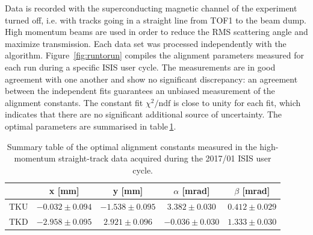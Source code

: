 Data is recorded with the superconducting magnetic channel of the experiment turned off, i.e. with tracks going in a straight line from TOF1 to the beam dump. High momentum beams are used in order to reduce the RMS scattering angle and maximize transmission.  
Each data set was processed independently with the algorithm. Figure~\ref{fig:runtorun} compiles the alignment parameters measured for each run during a specific ISIS user cycle. The measurements are in good agreement with one another and show no significant discrepancy: an agreement between the independent fits guarantees an unbiased measurement of the alignment constants. The constant fit $\chi^2/\text{ndf}$ is close to unity for each fit, which indicates that there are no significant additional source of uncertainty. The optimal parameters are summarised in table\,\ref{tab:201701_constants}. 

\begin{table}[h!]
	\centering
		\begin{tabular}{l|c|c|c|c}
			& x [mm] & y [mm] & $\alpha$ [mrad] & $\beta$ [mrad] \\
			\hline
			TKU & $-0.032\pm0.094$ & $-1.538\pm0.095$ & $ 3.382\pm0.030$ & $0.412\pm0.029$ \\
			TKD & $-2.958\pm0.095$ & $ 2.921\pm0.096$ & $-0.036\pm0.030$ & $1.333\pm0.030$
		\end{tabular}
	\caption{Summary table of the optimal alignment constants measured in the high-momentum straight-track data acquired during the 2017/01 ISIS user cycle.}
	\label{tab:201701_constants}
\end{table}


